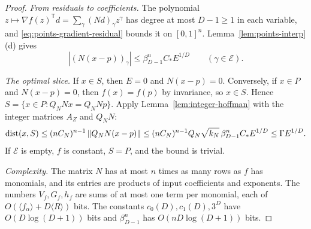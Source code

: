 \begin{proof}
\emph{From residuals to coefficients.} The polynomial
$z\mapsto\nabla f(z)^{\mathsf T}d=\sum_\gamma(Nd)_\gamma z^\gamma$ has
degree at most $D-1\ge1$ in each variable, and
\eqref{eq:points-gradient-residual} bounds it on $[0,1]^n$.
Lemma~\ref{lem:points-interp}(d) gives
\[
 |(N(x-p))_\gamma|\le\beta_{D-1}^nC_*E^{1/D}\qquad(\gamma\in\mathcal E).
\]

\emph{The optimal slice.} If $x\in S$, then $E=0$ and $N(x-p)=0$.
Conversely, if $x\in P$ and $N(x-p)=0$, then $f(x)=f(p)$ by invariance, so
$x\in S$. Hence $S=\{x\in P:Q_NNx=Q_NNp\}$. Apply
Lemma~\ref{lem:integer-hoffman} with the integer matrices $A_Z$ and $Q_NN$:
\[
 \operatorname{dist}(x,S)\le(nC_N)^{n-1}\left\lVert Q_NN(x-p)\right\rVert
 \le(nC_N)^{n-1}Q_N\sqrt{k_N}\,\beta_{D-1}^nC_*E^{1/D}\le\Gamma E^{1/D}.
\]
If $\mathcal E$ is empty, $f$ is constant, $S=P$, and the bound is trivial.

\emph{Complexity.} The matrix $N$ has at most $n$ times as many rows as $f$
has monomials, and its entries are products of input coefficients and
exponents. The numbers $V_f,G_f,h_f$ are sums of at most one term per
monomial, each of $O(\langle f_\alpha\rangle+D\langle R\rangle)$ bits. The
constants $c_0(D),c_1(D),3^D$ have $O(D\log(D+1))$ bits and
$\beta_{D-1}^n$ has $O(nD\log(D+1))$ bits.
\end{proof}

